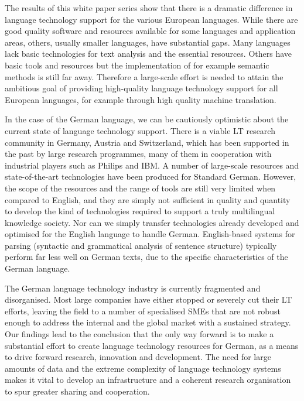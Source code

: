\documentclass[]{../../metanetpaper}
\begin{document}
\begin{multicols}{2}
The results of this white paper series show that there is a dramatic difference in language technology support for the various European languages. While there are good quality software and resources available for some languages and application areas, others, usually smaller languages, have substantial gaps. Many languages lack basic technologies for text analysis and the essential resources. Others have basic tools and resources but the implementation of for example semantic methods is still far away. Therefore a large-scale effort is needed to attain the ambitious goal of providing high-quality language technology support for all European languages, for example through high quality machine translation. 

In the case of the German language, we can be cautiously optimistic about the current state of language technology support. There is a viable LT research community in Germany, Austria and Switzerland, which has been supported in the past by large research programmes, many of them in cooperation with industrial players such as Philips and IBM. A number of large-scale resources and state-of-the-art technologies have been produced for Standard German. However, the scope of the resources and the range of tools are still very limited when compared to English, and they are simply not sufficient in quality and quantity to develop the kind of technologies required to support a truly multilingual knowledge society. Nor can we simply transfer technologies already developed and optimised for the English language to handle German. English-based systems for parsing (syntactic and grammatical analysis of sentence structure) typically perform far less well on German texts, due to the specific characteristics of the German language.

The German language technology industry is currently fragmented and disorganised. Most large companies have either stopped or severely cut their LT efforts, leaving the field to a number of specialised SMEs that are not robust enough to address the internal and the global market with a sustained strategy. Our findings lead to the conclusion that the only way forward is to make a substantial effort to create language technology resources for German, as a means to drive forward research, innovation and development. The need for large amounts of data and the extreme complexity of language technology systems makes it vital to develop an infrastructure and a coherent research organisation to spur greater sharing and cooperation.


\end{multicols}
\end{document}

